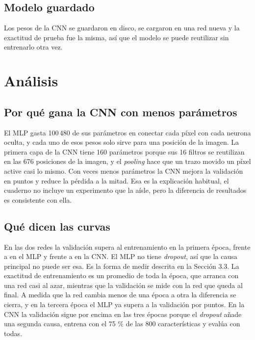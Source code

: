 \documentclass[11pt,letterpaper]{article}
\begin{document}
\subsection{Modelo guardado}

Los pesos de la CNN se guardaron en disco, se cargaron en una red nueva y la exactitud de prueba fue la misma, así que el modelo se puede reutilizar sin entrenarlo otra vez.

\section{Análisis}

\subsection{Por qué gana la CNN con menos parámetros}

El MLP gasta 100\,480 de sus parámetros en conectar cada píxel con cada neurona oculta, y cada uno de esos pesos solo sirve para una posición de la imagen. La primera capa de la CNN tiene 160 parámetros porque sus 16 filtros se reutilizan en las 676 posiciones de la imagen, y el \emph{pooling} hace que un trazo movido un píxel active casi lo mismo. Con \razonParam{} veces menos parámetros la CNN mejora la validación en \difVal{} puntos y reduce la pérdida a la mitad. Esa es la explicación habitual, el cuaderno no incluye un experimento que la aísle, pero la diferencia de resultados es consistente con ella.

\subsection{Qué dicen las curvas}

En las dos redes la validación supera al entrenamiento en la primera época, \vaccMlpA{} frente a \accMlpA{} en el MLP y \vaccCnnA{} frente a \accCnnA{} en la CNN. El MLP no tiene \emph{dropout}, así que la causa principal no puede ser esa. Es la forma de medir descrita en la Sección 3.3. La exactitud de entrenamiento es un promedio de toda la época, que arranca con una red casi al azar, mientras que la validación se mide con la red que queda al final. A medida que la red cambia menos de una época a otra la diferencia se cierra, y en la tercera época el MLP ya supera a la validación por \brechaMlpC{} puntos. En la CNN la validación sigue por encima en las tres épocas porque el \emph{dropout} añade una segunda causa, entrena con el 75 \% de las 800 características y evalúa con todas.
\end{document}
